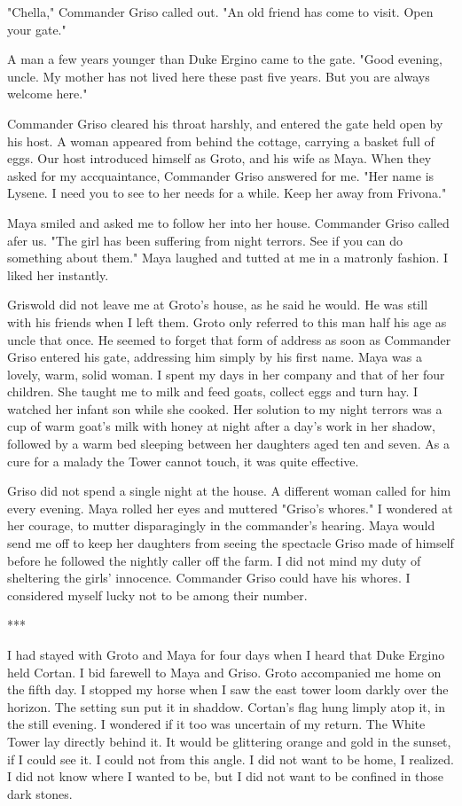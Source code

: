 \documentclass{article}
\begin{document}
"Chella," Commander Griso called out. "An old friend has come to visit. Open your gate."

A man a few years younger than Duke Ergino came to the gate. "Good evening, uncle. My mother has not lived here these past five years. But you are always welcome here."

Commander Griso cleared his throat harshly, and entered the gate held open by his host. A woman appeared from behind the cottage, carrying a basket full of eggs. Our host introduced himself as Groto, and his wife as Maya. When they asked for my accquaintance, Commander Griso answered for me. "Her name is Lysene. I need you to see to her needs for a while. Keep her away from Frivona."

Maya smiled and asked me to follow her into her house. Commander Griso called afer us. "The girl has been suffering from night terrors. See if you can do something about them." Maya laughed and tutted at me in a matronly fashion. I liked her instantly.

Griswold did not leave me at Groto's house, as he said he would. He was still with his friends when I left them. Groto only referred to this man half his age as uncle that once. He seemed to forget that form of address as soon as Commander Griso entered his gate, addressing him simply by his first name. Maya was a lovely, warm, solid woman. I spent my days in her company and that of her four children. She taught me to milk and feed goats, collect eggs and turn hay. I watched her infant son while she cooked. Her solution to my night terrors was a cup of warm goat's milk with honey at night after a day's work in her shadow, followed by a warm bed sleeping between her daughters aged ten and seven. As a cure for a malady the Tower cannot touch, it was quite effective. 

Griso did not spend a single night at the house. A different woman called for him every evening. Maya rolled her eyes and muttered "Griso's whores." I wondered at her courage, to mutter disparagingly in the commander's hearing. Maya would send me off to keep her daughters from seeing the spectacle Griso made of himself before he followed the nightly caller off the farm. I did not mind my duty of sheltering the girls' innocence. Commander Griso could have his whores. I considered myself lucky not to be among their number. 

***

I had stayed with Groto and Maya for four days when I heard that Duke Ergino held Cortan. I bid farewell to Maya and Griso. Groto accompanied me home on the fifth day. I stopped my horse when I saw the east tower loom darkly over the horizon. The setting sun put it in shaddow. Cortan's flag hung limply atop it, in the still evening. I wondered if it too was uncertain of my return. The White Tower lay directly behind it. It would be glittering orange and gold in the sunset, if I could see it. I could not from this angle. I did not want to be home, I realized. I did not know where I wanted to be, but I did not want to be confined in those dark stones.
\end{document}
